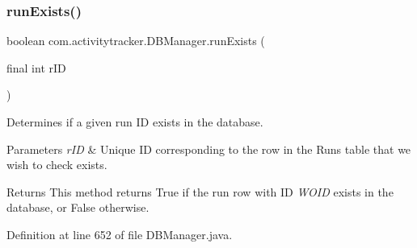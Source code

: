 \mbox{\label{classcom_1_1activitytracker_1_1_d_b_manager_a723ac1c573bacdd0b62894357bd65a9b}} 
\subsubsection{\texorpdfstring{run\+Exists()}{runExists()}}
{\footnotesize\ttfamily boolean com.\+activitytracker.\+D\+B\+Manager.\+run\+Exists (\begin{DoxyParamCaption}\item[{final int}]{r\+ID }\end{DoxyParamCaption})}

Determines if a given run ID exists in the database.


\begin{DoxyParams}{Parameters}
{\em r\+ID} & Unique ID corresponding to the row in the Runs table that we wish to check exists.\\
\hline
\end{DoxyParams}
\begin{DoxyReturn}{Returns}
This method returns True if the run row with ID {\itshape W\+O\+ID} exists in the database, or False otherwise. 
\end{DoxyReturn}


Definition at line 652 of file D\+B\+Manager.\+java.


